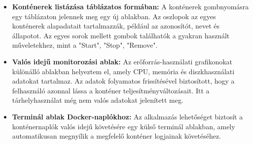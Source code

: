 \begin{itemize}
	\item \textbf{Konténerek listázása táblázatos formában:} A konténerek gombnyomásra egy táblázaton jelennek meg egy új ablakban. Az oszlopok az egyes konténerek alapadatait tartalmazzák, például az azonosítót, nevet és állapotot. Az egyes sorok mellett gombok találhatók a gyakran használt műveletekhez, mint a "Start", "Stop", "Remove".
	\item \textbf{Valós idejű monitorozási ablak:} Az erőforrás-használati grafikonokat különálló ablakban helyeztem el, amely CPU, memória és diszkhasználati adatokat tartalmaz. Az adatok folyamatos frissítésével biztosított, hogy a felhasználó azonnal lássa a konténer teljesítményváltozásait. Itt a tárhelyhasználat még nem valós adatokat jelenített meg.
	\item \textbf{Terminál ablak Docker-naplókhoz:} Az alkalmazás lehetőséget biztosít a konténernaplók valós idejű követésére egy külső terminál ablakban, amely automatikusan megnyílik a megfelelő konténer logjainak követéséhez.
\end{itemize}

